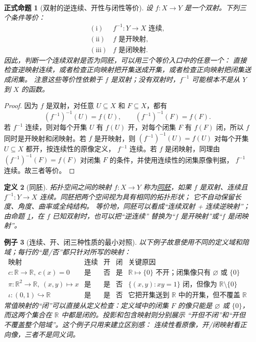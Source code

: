 \documentclass[UTF8,fontset=none,a4paper,11pt]{ctexart}
\theoremstyle{foundation-definition}
\newtheorem{definition}{定义}[section]
\theoremstyle{foundation-theorem}
\theoremstyle{foundation-proposition}
\newtheorem{proposition}[definition]{正式命题}
\theoremstyle{foundation-example}
\newtheorem{example}[definition]{例子}
\theoremstyle{foundation-remark}
\theoremstyle{foundation-theorem}
\newcommand{\term}[2]{\hyperref[#1]{#2}}
\begin{document}
\begin{proposition}[双射的逆连续、开性与闭性等价]\label{prop:bijective-topological-equivalences}
设 \(f:X\to Y\) 是一个双射。下列三个条件等价：
\[
\begin{array}{rcl}
(\mathrm{i})& f^{-1}:Y\to X\text{ 连续},\\
(\mathrm{ii})& f\text{ 是开映射},\\
(\mathrm{iii})& f\text{ 是闭映射}.
\end{array}
\]
因此，判断一个连续双射是否为同胚，可以用三个等价入口中的任意一个：
直接检查逆映射连续，或者检查正向映射把开集送成开集，或者检查正向映射把闭集送成闭集。
注意这些等价性依赖于 \(f\) 是双射；没有双射时，\(f^{-1}\) 可能根本不是从 \(Y\) 到 \(X\) 的函数。
\end{proposition}

\begin{proof}
因为 \(f\) 是双射，对任意 \(U\subseteq X\) 和 \(F\subseteq X\)，都有
\[
  (f^{-1})^{-1}(U)=f(U),\qquad
  (f^{-1})^{-1}(F)=f(F).
\]
若 \(f^{-1}\) 连续，则对每个开集 \(U\) 有 \(f(U)\) 开，对每个闭集 \(F\) 有
\(f(F)\) 闭，所以 \(f\) 同时是开映射和闭映射。若 \(f\) 是开映射，则
\((f^{-1})^{-1}(U)=f(U)\) 对每个开集 \(U\subseteq X\) 都开，按连续性的原像定义，
\(f^{-1}\) 连续。若 \(f\) 是闭映射，同理由
\((f^{-1})^{-1}(F)=f(F)\) 对闭集 \(F\) 的条件，并使用连续性的闭集原像判据，
\(f^{-1}\) 连续。故三者等价。
\end{proof}

\begin{definition}[同胚]\label{def:homeomorphism}
拓扑空间之间的映射 \(f:X\to Y\) 称为\term{def:homeomorphism}{同胚}，如果
\(f\) 是双射、连续且 \(f^{-1}:Y\to X\) 连续。同胚把两个空间视为具有相同的拓扑形状；
它不自动保留长度、角度、曲率或全纯结构。
等价地，同胚可以看成“连续双射 + 连续逆映射”；由命题
\ref{prop:bijective-topological-equivalences}，在 \(f\) 已知双射时，也可以把“逆连续”
替换为“\(f\) 是开映射”或“\(f\) 是闭映射”。
\end{definition}

\begin{example}[连续、开、闭三种性质的最小对照]\label{ex:continuous-open-closed-map}
以下例子故意使用不同的定义域和陪域；每行的“是/否”都只针对所写的映射：
\[
\begin{array}{c|c|c|c|c}
\text{映射}&\text{连续}&\text{开}&\text{闭}&\text{关键原因}\\
\hline
c:\mathbb R\to\mathbb R,\ c(x)=0
&\text{是}&\text{否}&\text{是}&\mathbb R\mapsto\{0\}\text{ 不开；闭集像只有 }\varnothing\text{ 或 }\{0\}\\
\pi:\mathbb R^2\to\mathbb R,\ (x,y)\mapsto x
&\text{是}&\text{是}&\text{否}&\{(x,y):xy=1\}\text{ 闭，但像为 }\mathbb R\setminus\{0\}\\
\iota:(0,1)\hookrightarrow\mathbb R
&\text{是}&\text{是}&\text{否}&\text{它把开集送到 }\mathbb R\text{ 中的开集，但不覆盖 }\mathbb R
\end{array}
\]
常值映射的“闭”可以直接从定义检查：定义域中的闭集 \(F\) 的像只能是
\(\varnothing\) 或 \(\{0\}\)，而这两个集合在 \(\mathbb R\) 中都是闭的。投影和包含映射则分别展示
“开但不闭”和“开但不覆盖整个陪域”。这个例子只用来建立区别感：
连续性看原像，开/闭映射看正向像，三者不是同义词。
\end{example}
\end{document}
